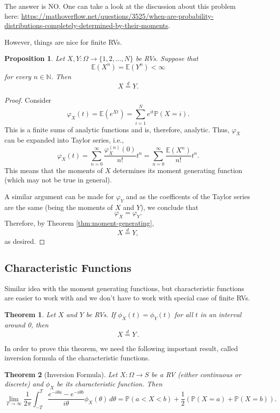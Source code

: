 \documentclass[
  openany]{book}
\newtheorem{theorem}{Theorem}[chapter]
\newtheorem{proposition}{Proposition}[chapter]
\theoremstyle{definition}
\theoremstyle{definition}
\theoremstyle{definition}
\theoremstyle{definition}
\theoremstyle{remark}
\begin{document}
The answer is NO. One can take a look at the discussion about this problem here:
\url{https://mathoverflow.net/questions/3525/when-are-probability-distributions-completely-determined-by-their-moments}.

However, things are nice for finite RVs.

\begin{proposition}
Let \(X,Y: \Omega \to \{1,2, \dots, N\}\) be RVs. Suppose that
\[ \mathbb{E}(X^n) = \mathbb{E}(Y^n) < \infty\]
for every \(n\in \mathbb{N}\). Then
\[ X \stackrel{d}{=}Y .\]
\end{proposition}

\begin{proof}
Consider
\[ \varphi_X(t) = \mathbb{E}(e^{Xt}) = \sum_{i = 1}^N e^{it} \mathbb{P}( X = i). \]
This is a finite sums of analytic functions and is, therefore, analytic.
Thus, \(\varphi_X\) can be expanded into Taylor series, i.e.,
\[ \varphi_X(t)  = \sum_{n=0}^\infty \frac{\varphi_X^{(n)}(0)}{n!} t^n 
 = \sum_{n=0}^\infty \frac{\mathbb{E}(X^n)}{n!} t^n.\]
This means that the moments of \(X\) determines its moment generating function
(which may not be true in general).

A similar argument can be made for \(\varphi_Y\) and as the coefficents of the
Taylor series are the same (being the moments of \(X\) and \(Y\)), we conclude
that
\[\varphi_X = \varphi_Y.\]
Therefore,
by Theorem \ref{thm:moment-generating},
\[ X \stackrel{d}{=}Y, \]
as desired.
\end{proof}

\subsection{Characteristic Functions}\label{characteristic-functions}

Similar idea with the moment generating functions, but
characteristic functions are easier to work with and we don't have to
work with special case of finite RVs.

\begin{theorem}
Let \(X\) and \(Y\) be RVs. If \(\phi_X(t) = \phi_Y(t)\) for all \(t\) in an interval around 0, then
\[ X  \stackrel{d}{=}Y \,.\]
\end{theorem}

In order to prove this theorem, we need the following important result, called
inversion formula of the characteristic functions.

\begin{theorem}[Inversion Formula]
Let \(X:\Omega \to S\) be a RV (either continuous or discrete)
and \(\phi_X\) be its characteristic function.
Then
\[  \lim_{T \to \infty} \frac{1}{2\pi}\int_{-T}^T \frac{e^{-i\theta a} 
- e^{-i\theta b}}{i\theta} \phi_X(\theta) \, d\theta
= \mathbb{P}( a < X < b) + \frac{1}{2} \left( \mathbb{P}(X = a) + \mathbb{P}(X = b)  \right). \]
\end{theorem}
\end{document}
